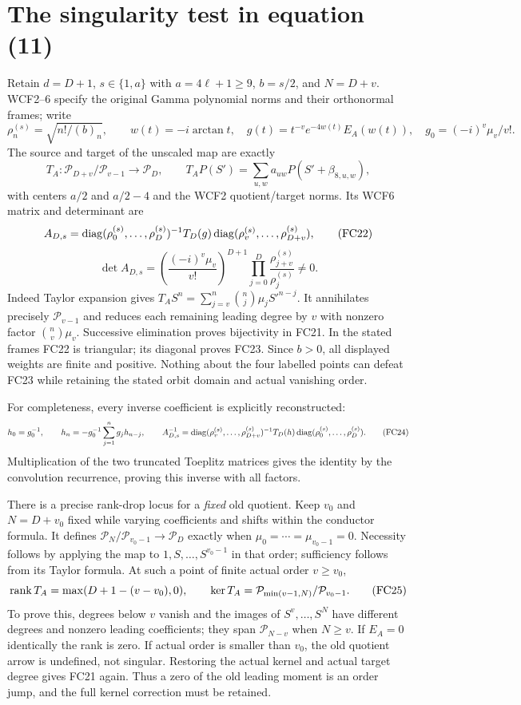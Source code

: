 \section{The singularity test in equation (11)}
Retain $d=D+1$, $s\in\{1,a\}$ with $a=4\ell+1\ge9$,
$b=s/2$, and $N=D+v$. WCF2--6 specify the original Gamma polynomial
norms and their orthonormal frames; write
\[
 \rho_n^{(s)}=\sqrt{n!/(b)_n},\qquad
 w(t)=-i\arctan t,\quad
 g(t)=t^{-v}e^{-4w(t)}E_A(w(t)),\quad
 g_0=(-i)^v\mu_v/v!.
 \tag{FC20}
\]
The source and target of the unscaled map are exactly
\[
 T_A:\mathcal P_{D+v}/\mathcal P_{v-1}\to\mathcal P_D,
 \qquad T_AP(S')=\sum_{u,w}a_{uw}P(S'+\beta_{8,u,w}),
 \tag{FC21}
\]
with centers $a/2$ and $a/2-4$ and the WCF2 quotient/target norms.
Its WCF6 matrix and determinant are
\[
 A_{D,s}=\operatorname{diag}(\rho_0^{(s)},\ldots,\rho_D^{(s)})^{-1}
 T_D(g)\operatorname{diag}(\rho_v^{(s)},\ldots,\rho_{D+v}^{(s)}),
 \tag{FC22}
\]
\[
 \det A_{D,s}=\left(\frac{(-i)^v\mu_v}{v!}\right)^{D+1}
 \prod_{j=0}^D\frac{\rho_{j+v}^{(s)}}{\rho_j^{(s)}}\ne0.
 \tag{FC23}
\]
Indeed Taylor expansion gives
$T_AS^n=\sum_{j=v}^n\binom nj\mu_j S'^{n-j}$.
It annihilates precisely $\mathcal P_{v-1}$ and reduces each remaining
leading degree by $v$ with nonzero factor $\binom nv\mu_v$.
Successive elimination proves bijectivity in FC21. In the stated frames
FC22 is triangular; its diagonal proves FC23. Since $b>0$, all displayed
weights are finite and positive. Nothing about the four labelled points
can defeat FC23 while retaining the stated orbit domain and actual
vanishing order.

For completeness, every inverse coefficient is explicitly reconstructed:
\[
 h_0=g_0^{-1},\qquad
 h_n=-g_0^{-1}\sum_{j=1}^ng_jh_{n-j},\qquad
 A_{D,s}^{-1}=\operatorname{diag}(\rho_v^{(s)},\ldots,\rho_{D+v}^{(s)})^{-1}
 T_D(h)\operatorname{diag}(\rho_0^{(s)},\ldots,\rho_D^{(s)}).
 \tag{FC24}
\]
Multiplication of the two truncated Toeplitz matrices gives the identity
by the convolution recurrence, proving this inverse with all factors.

There is a precise rank-drop locus for a \emph{fixed} old quotient.
Keep $v_0$ and $N=D+v_0$ fixed while varying coefficients and shifts
within the conductor formula. It defines
$\mathcal P_N/\mathcal P_{v_0-1}\to\mathcal P_D$ exactly when
$\mu_0=\cdots=\mu_{v_0-1}=0$. Necessity follows by applying the map to
$1,S,\ldots,S^{v_0-1}$ in that order; sufficiency follows from its Taylor
formula. At such a point of finite actual order $v\ge v_0$,
\[
 \operatorname{rank} T_A=\max(D+1-(v-v_0),0),\qquad
 \ker T_A=\mathcal P_{\min(v-1,N)}/\mathcal P_{v_0-1}.
 \tag{FC25}
\]
To prove this, degrees below $v$ vanish and the images of
$S^v,\ldots,S^N$ have different degrees and nonzero leading coefficients;
they span $\mathcal P_{N-v}$ when $N\ge v$. If $E_A=0$ identically the
rank is zero. If actual order is smaller than $v_0$, the old quotient
arrow is undefined, not singular. Restoring the actual kernel and actual
target degree gives FC21 again. Thus a zero of the old leading moment
is an order jump, and the full kernel correction must be retained.

